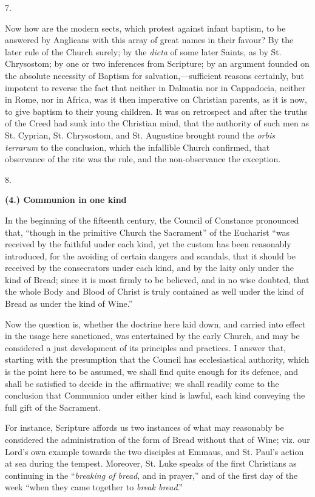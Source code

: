 7.

Now how are the modern sects, which protest against
infant baptism, to be answered by Anglicans with this
array of great names in their favour? By the later rule
of the Church surely; by the \emph{ dicta} of some later Saints,
as by St. Chrysostom; by one or two inferences from
Scripture; by an argument founded on the absolute
necessity of Baptism for salvation,—sufficient
reasons certainly, but impotent to reverse the fact that
neither in Dalmatia nor in Cappadocia, neither in Rome,
nor in Africa, was it then imperative on Christian
parents, as it is now, to give baptism to their young
children. It was on retrospect and after the truths of
the Creed had sunk into the Christian mind, that the
authority of such men as St. Cyprian, St. Chrysostom, and
St. Augustine brought round the \emph{orbis terrarum} to
the conclusion, which the infallible Church confirmed,
that observance of the rite was the rule, and the
non-observance the exception.

8.

\textbf{(4.) Communion in one kind}

In the beginning of the fifteenth century, the Council of
Constance pronounced that, ``though in the primitive Church the Sacrament'' of the Eucharist ``was
received by the faithful under each kind, yet the custom
has been reasonably introduced, for the avoiding of
certain dangers and scandals, that it should be received
by the consecrators under each kind, and by the laity
only under the kind of Bread; since it is most firmly to
be believed, and in no wise doubted, that the whole Body
and Blood of Christ is truly contained as well under the
kind of Bread as under the kind of Wine.''

Now the question is, whether the doctrine here laid
down, and carried into effect in the usage here
sanctioned, was entertained by the early Church, and may
be considered a just development of its principles and
practices. I answer that, starting with the presumption
that the Council has ecclesiastical authority, which is
the point here to be assumed, we shall find quite enough
for its defence, and shall be satisfied to decide in the
affirmative; we shall readily come to the conclusion that
Communion under either kind is lawful, each kind
conveying the full gift of the Sacrament.

For instance, Scripture affords us two instances of
what may reasonably be considered the administration of
the form of Bread without that of Wine; viz. our Lord's
own example towards the two disciples at Emmaus, and St.
Paul's action at sea during the tempest. Moreover, St.
Luke speaks of the first Christians as continuing in the
``\emph{breaking of bread}, and in prayer,'' and of the
first day of the week ``when they came together to \emph{
break bread}.''


